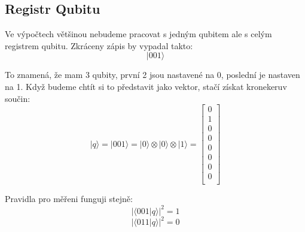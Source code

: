 \documentclass[11pt]{article}
\begin{document}
\subsection{Registr Qubitu}
Ve výpočtech většinou nebudeme pracovat s jedným qubitem ale s celým registrem qubitu. Zkráceny zápis by vypadal takto:
$$|001\rangle$$
\par To znamená, že mam 3 qubity, první 2 jsou nastavené na 0, poslední je nastaven na 1.
Když budeme chtít si to představit jako vektor, stačí získat kronekeruv součin:
$$|q\rangle = |001\rangle = |0\rangle \otimes |0\rangle \otimes |1\rangle = \begin{bmatrix}
        0 \\
        1 \\
        0 \\
        0 \\
        0 \\
        0 \\
        0 \\
        0 \\
    \end{bmatrix}$$
\par Pravidla pro měřeni funguji stejně:
$$|\langle001|q\rangle|^2 = 1$$
$$|\langle 011|q\rangle|^2 = 0$$
\end{document}
